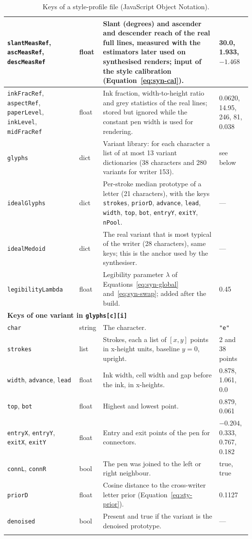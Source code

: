 {\begin{longtable}{|p{3.2cm}|p{1.6cm}|p{6.6cm}|p{2.5cm}|}
\hline
\texttt{slantMeasRef}, \texttt{ascMeasRef}, \texttt{descMeasRef} & float & Slant (degrees) and ascender and descender reach of the real full lines, measured with the estimators later used on synthesised renders; input of the style calibration (Equation~\ref{eq:syn-cal}). & 30.0, 1.933, $-1.468$ \\
\hline
\texttt{inkFracRef}, \texttt{aspectRef}, \texttt{paperLevel}, \texttt{inkLevel}, \texttt{midFracRef} & float & Ink fraction, width-to-height ratio and grey statistics of the real lines; stored but ignored while the constant pen width is used for rendering. & 0.0620, 14.95, 246, 81, 0.038 \\
\hline
\texttt{glyphs} & dict & Variant library: for each character a list of at most 13 variant dictionaries (38 characters and 280 variants for writer 153). & see below \\
\hline
\texttt{idealGlyphs} & dict & Per-stroke median prototype of a letter (21 characters), with the keys \texttt{strokes}, \texttt{priorD}, \texttt{advance}, \texttt{lead}, \texttt{width}, \texttt{top}, \texttt{bot}, \texttt{entryY}, \texttt{exitY}, \texttt{nPool}. & --- \\
\hline
\texttt{idealMedoid} & dict & The real variant that is most typical of the writer (28 characters), same keys; this is the anchor used by the synthesiser. & --- \\
\hline
\texttt{legibilityLambda} & float & Legibility parameter $\lambda$ of Equations~\ref{eq:syn-global} and~\ref{eq:syn-swap}; added after the build. & 0.45 \\
\hline
\multicolumn{4}{|l|}{\textbf{Keys of one variant in \texttt{glyphs[c][i]}}} \\
\hline
\texttt{char} & string & The character. & \texttt{"e"} \\
\hline
\texttt{strokes} & list & Strokes, each a list of $[x,y]$ points in x-height units, baseline $y=0$, upright. & 2 and 38 points \\
\hline
\texttt{width}, \texttt{advance}, \texttt{lead} & float & Ink width, cell width and gap before the ink, in x-heights. & 0.878, 1.061, 0.0 \\
\hline
\texttt{top}, \texttt{bot} & float & Highest and lowest point. & 0.879, 0.061 \\
\hline
\texttt{entryX}, \texttt{entryY}, \texttt{exitX}, \texttt{exitY} & float & Entry and exit points of the pen for connectors. & $-0.204$, 0.333, 0.767, 0.182 \\
\hline
\texttt{connL}, \texttt{connR} & bool & The pen was joined to the left or right neighbour. & true, true \\
\hline
\texttt{priorD} & float & Cosine distance to the cross-writer letter prior (Equation~\ref{eq:sty-prior}). & 0.1127 \\
\hline
\texttt{denoised} & bool & Present and true if the variant is the denoised prototype. & --- \\
\hline
\caption{Keys of a style-profile file (JavaScript Object Notation).}
\label{tab:sty-schema}
\end{longtable}
}

